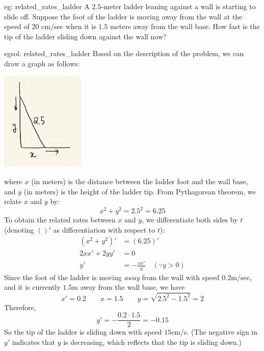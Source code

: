 \begin{eg}[]{eg: related_rates_ladder}
    A $2.5$-meter ladder leaning against a wall is starting to slide off.  Suppose the foot of the ladder is moving away from the wall at the speed of $20$ cm/sec when it is $1.5$ meters away from the wall base.  How fast is the tip of the ladder sliding down against the wall now?
\end{eg}

\begin{egsol}[]{egsol: related_rates_ladder}
    Based on the description of the problem, we can draw a graph as follows:
    \begin{center}
        \includegraphics[width = 0.3\textwidth, trim={0 2cm 0 3cm}, clip]{figures/chap 05/rel_rates_ladder.png}
        \label{fig: rel_rates_ladder}    
    \end{center}
    where $x$ (in meters) is the distance between the ladder foot and the wall base, and $y$ (in meters) is the height of the ladder tip.  From Pythagorean theorem, we relate $x$ and $y$ by:
    \[x^2+y^2 = 2.5^2 = 6.25\]
    To obtain the related rates between $x$ and $y$, we differentiate both sides by $t$ (denoting $()'$ as differentiation with respect to $t$):
    \begin{align*}
        (x^2+y^2)' &= (6.25)'\\
        2xx'+2yy' &= 0\\
        y' &= -\frac{xx'}{y}  \quad  (\because y > 0)
    \end{align*}
    Since the foot of the ladder is moving \textit{away} from the wall with speed $0.2$m/sec, and it is currently $1.5$m away from the wall base, we have
    \[x' = 0.2 \qquad x = 1.5 \qquad y = \sqrt{2.5^2-1.5^2} = 2\]
    Therefore, 
    \[y' = -\frac{0.2 \cdot 1.5}{2} = -0.15\]
    So the tip of the ladder is sliding down with speed $15$cm/s. (The negative sign in $y'$ indicates that $y$ is decreasing, which reflects that the tip is sliding down.)
\end{egsol}

